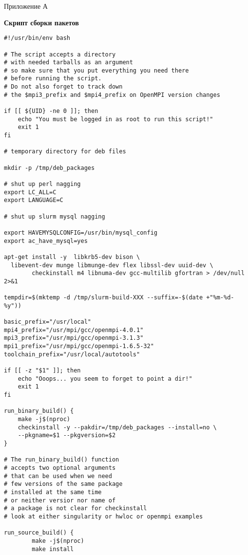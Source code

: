 \documentclass[a4paper]{extarticle}
\begin{document}
\newpage

\begin{flushright}Приложение А\end{flushright}
\centerline{\textbf{Скрипт сборки пакетов}}

\begin{verbatim}
#!/usr/bin/env bash

# The script accepts a directory
# with needed tarballs as an argument
# so make sure that you put everything you need there
# before running the script.
# Do not also forget to track down
# the $mpi3_prefix and $mpi4_prefix on OpenMPI version changes

if [[ ${UID} -ne 0 ]]; then
    echo "You must be logged in as root to run this script!"
    exit 1
fi

# temporary directory for deb files

mkdir -p /tmp/deb_packages

# shut up perl nagging
export LC_ALL=C
export LANGUAGE=C

# shut up slurm mysql nagging

export HAVEMYSQLCONFIG=/usr/bin/mysql_config
export ac_have_mysql=yes

apt-get install -y  libkrb5-dev bison \
  libevent-dev munge libmunge-dev flex libssl-dev uuid-dev \
        checkinstall m4 libnuma-dev gcc-multilib gfortran > /dev/null 2>&1

tempdir=$(mktemp -d /tmp/slurm-build-XXX --suffix=-$(date +"%m-%d-%y"))

basic_prefix="/usr/local"
mpi4_prefix="/usr/mpi/gcc/openmpi-4.0.1"
mpi3_prefix="/usr/mpi/gcc/openmpi-3.1.3"
mpi1_prefix="/usr/mpi/gcc/openmpi-1.6.5-32"
toolchain_prefix="/usr/local/autotools"

if [[ -z "$1" ]]; then
    echo "Ooops... you seem to forget to point a dir!"
    exit 1
fi

run_binary_build() {
    make -j$(nproc)
    checkinstall -y --pakdir=/tmp/deb_packages --install=no \
    --pkgname=$1 --pkgversion=$2
}

# The run_binary_build() function
# accepts two optional arguments
# that can be used when we need
# few versions of the same package
# installed at the same time
# or neither versior nor name of
# a package is not clear for checkinstall
# look at either singularity or hwloc or openmpi examples

run_source_build() {
        make -j$(nproc)
        make install


\end{verbatim}
\end{document}
